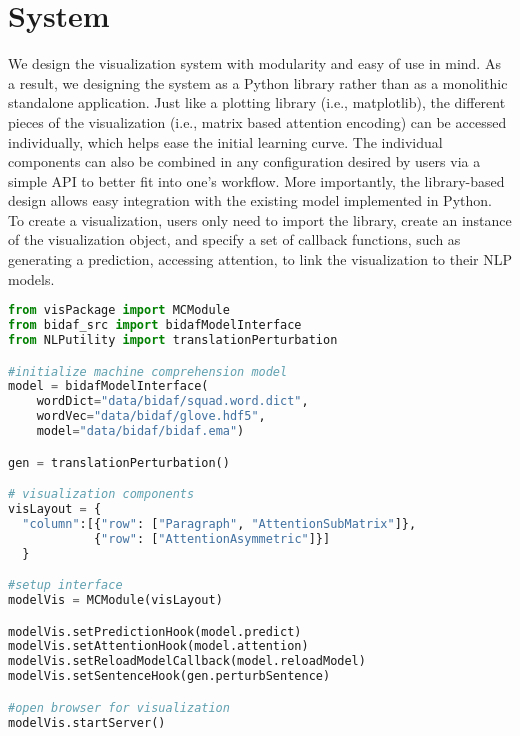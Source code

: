 \section{System}
We design the visualization system with modularity and easy of use in mind.
As a result, we designing the system as a Python library rather than as a monolithic standalone application. 
Just like a plotting library (i.e., matplotlib), the different pieces of the visualization (i.e., matrix based attention encoding) can be accessed individually, which helps ease the initial learning curve. 
The individual components can also be combined in any configuration desired by users via a simple API to better fit into one's workflow.
More importantly, the library-based design allows easy integration with the existing model implemented in Python.
%
To create a visualization, users only need to import the library, create an instance of the visualization object, and specify a set of callback functions, such as generating a prediction, accessing attention, to link the visualization to their NLP models. 

\begin{lstlisting}[language=Python, caption=Code for setting up the visualization system shown in the paper.]
from visPackage import MCModule
from bidaf_src import bidafModelInterface
from NLPutility import translationPerturbation

#initialize machine comprehension model
model = bidafModelInterface(
    wordDict="data/bidaf/squad.word.dict",
    wordVec="data/bidaf/glove.hdf5",
    model="data/bidaf/bidaf.ema")

gen = translationPerturbation()

# visualization components
visLayout = {
  "column":[{"row": ["Paragraph", "AttentionSubMatrix"]},
            {"row": ["AttentionAsymmetric"]}]
  }

#setup interface
modelVis = MCModule(visLayout)

modelVis.setPredictionHook(model.predict)
modelVis.setAttentionHook(model.attention)
modelVis.setReloadModelCallback(model.reloadModel)
modelVis.setSentenceHook(gen.perturbSentence)

#open browser for visualization
modelVis.startServer()
\end{lstlisting}

